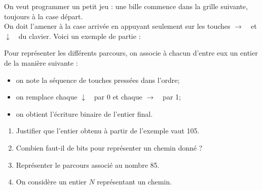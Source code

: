 \begin{exercice}
    On veut programmer un petit jeu : une bille commence dans la grille suivante, toujours à la case départ.\\
    On doit l'amener à la case arrivée en appuyant seulement sur les touches {$\rightarrow$}\ \ et {$\downarrow$}\ \ du clavier.
    Voici un exemple de partie :
    \begin{center}
    \end{center}
    Pour représenter les différents parcours, on associe à chacun d'entre eux un entier de la manière suivante :
    \begin{itemize}
        \item 	on note la séquence de touches pressées dans l'ordre;
        \item 	on remplace chaque {$\downarrow$}\ \ par 0 et chaque {$\rightarrow$}\ \ par 1;
        \item 	on obtient l'écriture binaire de l'entier final.
    \end{itemize}
    \begin{enumerate}
        \item 	Justifier que l'entier obtenu à partir de l'exemple vaut 105.
        \item 	Combien faut-il de bits pour représenter un chemin donné ?
        \item 	Représenter le parcours associé au nombre 85.
        \item 	On considère un entier $N$ représentant un chemin.
    \end{enumerate}
\end{exercice}

